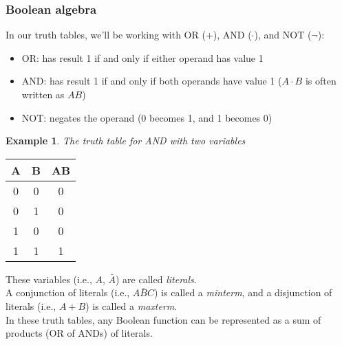 \documentclass{report}
\newtheorem{ex}{Example}[section]
\begin{document}
\subsubsection{Boolean algebra}
In our truth tables, we'll be working with OR (+), AND ($\cdot$), and NOT ($\neg$):
\begin{itemize}
\item OR: has result 1 if and only if either operand has value 1
\item AND: has result 1 if and only if both operands have value 1 ($A \cdot B$ is often written as $AB$)
\item NOT: negates the operand (0 becomes 1, and 1 becomes 0) 
\end{itemize} \newpage
\begin{ex}
The truth table for AND with two variables
\end{ex}
\begin{center}
\begin{tabular}{ | c | c | c | }
\hline A & B & AB \\ \hline
0 & 0 & 0 \\ \hline
0 & 1 & 0 \\ \hline
1 & 0 & 0 \\ \hline
1 & 1 & 1 \\ \hline
\end{tabular}
\end{center}
These variables (i.e., $A$, $\bar{A}$) are called \textit{literals}.\\
A conjunction of literals (i.e., $A\bar{B}C$) is called a \textit{minterm}, and a disjunction of literals (i.e., $A+B$) is called a \textit{maxterm}.\\
In these truth tables, any Boolean function can be represented as a sum of products (OR of ANDs) of literals.
\end{document}
